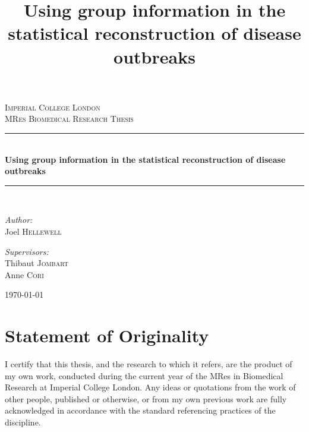 \documentclass[11pt,a4paper]{report}
\title{Using group information in the statistical reconstruction of disease outbreaks}
\newcommand{\HRule}{\rule{\linewidth}{0.5mm}}
\begin{document}
\begin{titlepage}
\begin{center}

\textsc{\LARGE Imperial College London}\\[1.5cm]

\textsc{\Large MRes Biomedical Research Thesis}\\[0.5cm]

\HRule \\[0.4cm]
{ \huge \bfseries Using group information in the statistical reconstruction of disease outbreaks \\[0.4cm] }

\HRule \\[1.5cm]

\noindent
\begin{minipage}{0.4\textwidth}
\begin{flushleft} \large
\emph{Author:}\\
Joel \textsc{Hellewell}
\end{flushleft}
\end{minipage}%
\begin{minipage}{0.4\textwidth}
\begin{flushright} \large
\emph{Supervisors:} \\
Thibaut \textsc{Jombart}\\
Anne \textsc{Cori}
\end{flushright}
\end{minipage}

\vfill

{\large \today}

\end{center}
\end{titlepage}




\chapter*{Statement of Originality}
\thispagestyle{empty}
\noindent I certify that this thesis, and the research to which it refers, are the product of my own work, conducted during the current year of the MRes in Biomedical Research at Imperial College London. Any ideas or quotations from the work of other people, published or otherwise, or from my own previous work are fully acknowledged in accordance with the standard referencing practices of the discipline. 
\end{document}
